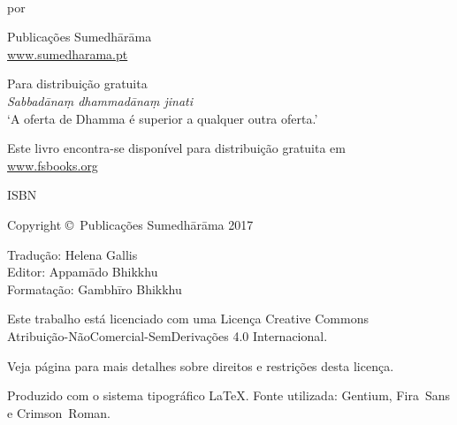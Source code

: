 \cleartoverso
\thispagestyle{empty}

\enlargethispage{\baselineskip}

{\copyrightsize
\centering
\setlength{\parindent}{0pt}%
\setlength{\parskip}{0.8\baselineskip}%

\thetitle\\
por \theauthor

Publicações Sumedhārāma\\
\href{http://sumedharama.pt}{www.sumedharama.pt}

Para distribuição gratuita\\
\textit{Sabbadānaṃ dhammadānaṃ jinati}\\
‘A oferta de Dhamma é superior a qualquer outra oferta.’

Este livro encontra-se disponível para distribuição gratuita em\\
\href{http://fsbooks.org/}{www.fsbooks.org}

ISBN \theISBN

Copyright \copyright\ Publicações Sumedhārāma 2017

Tradução: Helena Gallis\\
Editor: Appamādo Bhikkhu\\
Formatação: Gambhīro Bhikkhu

\vfill

Este trabalho está licenciado com uma Licença Creative Commons\\
Atribuição-NãoComercial-SemDerivações 4.0 Internacional.

Veja página \pageref{copyright-details} para mais detalhes sobre direitos e restrições desta licença.

Produzido com o sistema tipográfico \LaTeX. Fonte utilizada: Gentium, Fira~Sans e Crimson~Roman.

\theEditionInfo

}
